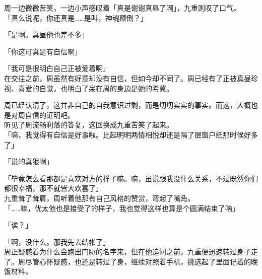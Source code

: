 周一边微微苦笑，一边小声感叹着「真是谢谢真昼了啊」，九重则叹了口气。\\

「真么说呢，你还真是……是叫，神魂颠倒？」

「是啊。真昼他也差不多」

「你这可真是有自信啊」

「我可是很明白自己正被爱着啊」\\

在交往之前，周虽然有好意却没有自信，但如今却不同了。周已经有了正被真昼珍视、喜爱的自觉，也明白了呆在周的身边是她的希冀。

周已经认清了，这并非自己的自我意识过剩，而是切切实实的事实。而这，大概也是对周自信的证明吧。\\

听见了周流畅利落的答复，这回换成九重苦笑了起来。\\

「嘛，我觉得有自信是好事啦。比起明明两情相悦却还是隔了层窗户纸那时候好多了」

「说的真狠啊」

「毕竟怎么看那都是喜欢对方的样子嘛。嘛，虽说跟我没什么关系，不过既然你们都很幸福，那不就皆大欢喜了」\\

九重耸了耸肩，周听着他那有自己风格的赞赏，弯起了嘴角。\\

「……嘛，优太他也是接受了的样子，我也觉得这样也算是个圆满结束了呐」

「诶？」

「啊，没什么。那我先去结帐了」\\

周正疑惑着为什么会跑出门胁的名字来，但在他追问之前，九重便迅速转过身子走了。周尽管心怀疑惑，也还是转过了身，继续对照着手机，挑选起了里面记着的晚饭材料。
